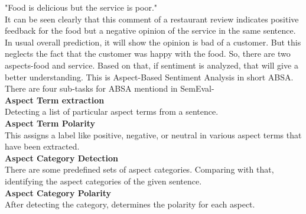 \documentclass[a4paper,12pt]{article}
\begin{document}
 \noindent\hspace{3cm}"Food is delicious but the service is poor."\vspace{1em}\\
It can be seen clearly that this comment of a restaurant review indicates positive feedback for the food but a negative opinion of the service in the same sentence. In usual overall prediction, it will show the opinion is bad of a customer. But this neglects the fact that the customer was happy with the food. So, there are two aspects-food and service. Based on that, if sentiment is analyzed, that will give a better understanding. This is Aspect-Based Sentiment Analysis in short ABSA.\\[1\baselineskip]
There are four sub-tasks for ABSA mentiond in SemEval\cite{semeval}-  \\[1\baselineskip]
\textbf{Aspect Term extraction}\\[1\baselineskip]
Detecting a list of particular aspect terms from a sentence. \\[1\baselineskip]
\textbf{Aspect Term Polarity}\\[1\baselineskip]
This assigns a label like positive, negative, or neutral in various aspect terms that have been extracted. \\[1\baselineskip]
\textbf{Aspect Category Detection}\\[1\baselineskip]
There are some predefined sets of aspect categories. Comparing with that, identifying the aspect categories of the given sentence.\\[1\baselineskip]
\textbf{Aspect Category Polarity}\\[1\baselineskip]
After detecting the category, determines the polarity for each aspect.

\end{document}
